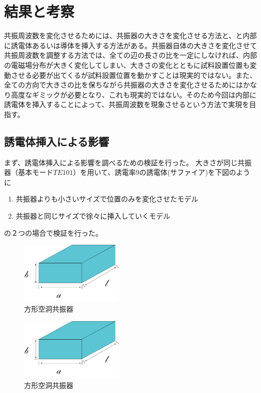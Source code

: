 \chapter{結果と考察}
共振周波数を変化させるためには、共振器の大きさを変化させる方法と、と内部に誘電体あるいは導体を挿入する方法がある。共振器自体の大きさを変化させて共振周波数を調整する方法では、全ての辺の長さの比を一定にしなければ、内部の電磁場分布が大きく変化してしまい、大きさの変化とともに試料設置位置も変動させる必要が出てくるが試料設置位置を動かすことは現実的ではない。また、全ての方向で大きさの比を保ちながら共振器の大きさを変化させるためにはかなり高度なギミックが必要となり、これも現実的ではない。そのため今回は内部に誘電体を挿入することによって、共振周波数を現象させるという方法で実現を目指す。


\section{誘電体挿入による影響}
まず、誘電体挿入による影響を調べるための検証を行った。
大きさが同じ共振器（基本モード$TE101$）を用いて、誘電率9の誘電体(サファイア)を下図のように

\begin{enumerate}
  \item 共振器よりも小さいサイズで位置のみを変化させたモデル
  \item 共振器と同じサイズで徐々に挿入していくモデル
\end{enumerate}

の２つの場合で検証を行った。

\vspace{10 mm}

\begin{figure}[h]
  \begin{center}
    \includegraphics[width=5cm]{./image/空洞共振器.png}
    \caption{方形空洞共振器}
    \label{fig:Cavity}
  \end{center}
\end{figure}

\vspace{10 mm}

\begin{figure}[h]
  \begin{center}
    \includegraphics[width=5cm]{./image/空洞共振器.png}
    \caption{方形空洞共振器}
    \label{fig:Cavity}
  \end{center}
\end{figure}

